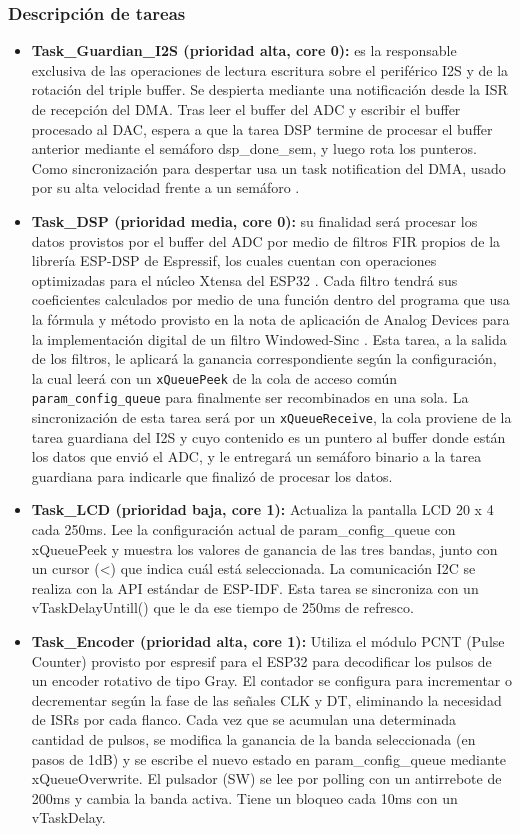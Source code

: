 \documentclass[RT]{UTNLSE}
\begin{document}
\subsubsection{Descripción de tareas}
\begin{itemize}
    \item \textbf{Task\_Guardian\_I2S (prioridad alta, core 0):} es la responsable exclusiva de las operaciones de lectura escritura sobre el periférico I2S y de la rotación del triple buffer. Se despierta mediante una notificación desde la ISR de recepción del DMA. Tras leer el buffer del ADC y escribir el buffer procesado al DAC, espera a que la tarea DSP termine de procesar el buffer anterior mediante el semáforo dsp\_done\_sem, y luego rota los punteros. Como sincronización para despertar usa un task notification del DMA, usado por su alta velocidad frente a un semáforo \cite{task_not}.
    \item \textbf{Task\_DSP (prioridad media, core 0):} su finalidad será procesar los datos provistos por el buffer del ADC por medio de filtros FIR propios de la librería ESP-DSP de Espressif, los cuales cuentan con operaciones optimizadas para el núcleo Xtensa del ESP32 \cite{gcc_aligned, esp_dsp_fir, esp_dsp_speed}. Cada filtro tendrá sus coeficientes calculados por medio de una función dentro del programa que usa la fórmula y método provisto en la nota de aplicación de Analog Devices para la implementación digital de un filtro Windowed-Sinc \cite{smith_windowed_sinc}. Esta tarea, a la salida de los filtros, le aplicará la ganancia correspondiente según la configuración, la cual leerá con un \texttt{xQueuePeek} de la cola de acceso común \texttt{param\_config\_queue} para finalmente ser recombinados en una sola. La sincronización de esta tarea será por un \texttt{xQueueReceive}, la cola proviene de la tarea guardiana del I2S y cuyo contenido es un puntero al buffer donde están los datos que envió el ADC, y le entregará un semáforo binario a la tarea guardiana para indicarle que finalizó de procesar los datos.
    \item \textbf{Task\_LCD (prioridad baja, core 1):} Actualiza la pantalla LCD 20 x 4 cada 250ms. Lee la configuración actual de param\_config\_queue con xQueuePeek y muestra los valores de ganancia de las tres bandas, junto con un cursor (<) que indica cuál está seleccionada. La comunicación I2C se realiza con la API estándar de ESP-IDF. Esta tarea se sincroniza con un vTaskDelayUntill() que le da ese tiempo de 250ms de refresco.
    \item \textbf{Task\_Encoder (prioridad alta, core 1):} Utiliza el módulo PCNT (Pulse Counter) provisto por espresif para el ESP32 para decodificar los pulsos de un encoder rotativo de tipo Gray. El contador se configura para incrementar o decrementar según la fase de las señales CLK y DT, eliminando la necesidad de ISRs por cada flanco. Cada vez que se acumulan una determinada cantidad de pulsos, se modifica la ganancia de la banda seleccionada (en pasos de 1dB) y se escribe el nuevo estado en param\_config\_queue mediante xQueueOverwrite. El pulsador (SW) se lee por polling con un antirrebote de 200ms y cambia la banda activa. Tiene un bloqueo cada 10ms con un vTaskDelay.

\end{itemize}
\end{document}
